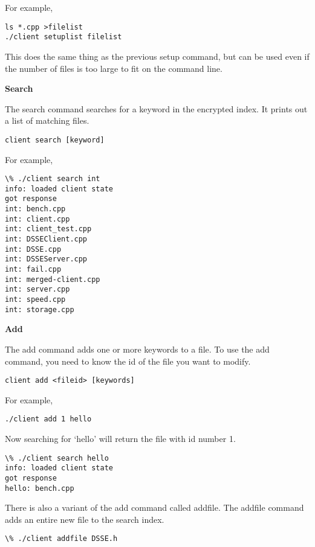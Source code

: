 For example,

\begin{lstlisting}
ls *.cpp >filelist
./client setuplist filelist
\end{lstlisting}

This does the same thing as the previous setup command, but can be used even if
the number of files is too large to fit on the command line.

\noindent\textbf{Search}

The search command searches for a keyword in the encrypted index.
It prints out a list of matching files.

\begin{lstlisting}
client search [keyword]
\end{lstlisting}

For example,

\begin{lstlisting}
\% ./client search int
info: loaded client state
got response
int: bench.cpp
int: client.cpp
int: client_test.cpp
int: DSSEClient.cpp
int: DSSE.cpp
int: DSSEServer.cpp
int: fail.cpp
int: merged-client.cpp
int: server.cpp
int: speed.cpp
int: storage.cpp
\end{lstlisting}

\noindent\textbf{Add}

The add command adds one or more keywords to a file.
To use the add command, you need to know the id of the file you want to modify.

\begin{lstlisting}
client add <fileid> [keywords]
\end{lstlisting}

For example,

\begin{lstlisting}
./client add 1 hello
\end{lstlisting}

Now searching for `hello' will return the file with id number 1.

\begin{lstlisting}
\% ./client search hello
info: loaded client state
got response
hello: bench.cpp
\end{lstlisting}

There is also a variant of the add command called addfile.
The addfile command adds an entire new file to the search index.

\begin{lstlisting}
\% ./client addfile DSSE.h
\end{lstlisting}

